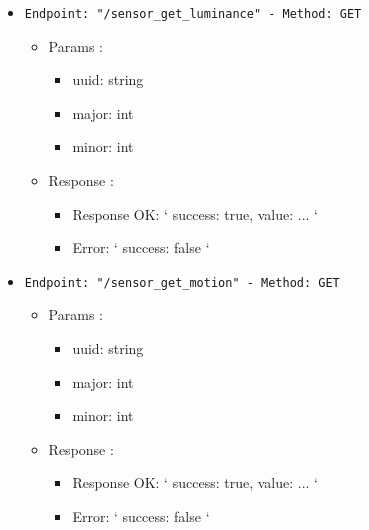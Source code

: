 \begin{itemize}
  \item \texttt{Endpoint: "/sensor_get_luminance" -  Method: GET}
  \begin{itemize} 
    \item Params :
    \begin{itemize}
      \item uuid: string
      \item major: int
      \item minor: int
    \end{itemize}

    \item Response : 
    \begin{itemize}
      \item Response OK: `{ success: true, value: ... }`
      \item Error: `{ success: false }`
    \end{itemize}
  \end{itemize}
\end{itemize}

\begin{itemize}
  \item \texttt{Endpoint: "/sensor_get_motion" -  Method: GET}
  \begin{itemize} 
    \item Params :
    \begin{itemize}
      \item uuid: string
      \item major: int
      \item minor: int
    \end{itemize}

    \item Response : 
    \begin{itemize}
      \item Response OK: `{ success: true, value: ... }`
      \item Error: `{ success: false }`
    \end{itemize}
  \end{itemize}
\end{itemize}

